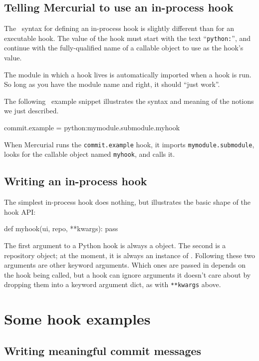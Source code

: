 \subsection{Telling Mercurial to use an in-process hook}

The \hgrc\ syntax for defining an in-process hook is slightly
different than for an executable hook.  The value of the hook must
start with the text ``\texttt{python:}'', and continue with the
fully-qualified name of a callable object to use as the hook's value.

The module in which a hook lives is automatically imported when a hook
is run.  So long as you have the module name and 
right, it should ``just work''.

The following \hgrc\ example snippet illustrates the syntax and
meaning of the notions we just described.
\begin{codesample2}
  [hooks]
  commit.example = python:mymodule.submodule.myhook
\end{codesample2}
When Mercurial runs the \texttt{commit.example} hook, it imports
\texttt{mymodule.submodule}, looks for the callable object named
\texttt{myhook}, and calls it.

\subsection{Writing an in-process hook}

The simplest in-process hook does nothing, but illustrates the basic
shape of the hook API:
\begin{codesample2}
  def myhook(ui, repo, **kwargs):
      pass
\end{codesample2}
The first argument to a Python hook is always a
 object.  The second is a repository object;
at the moment, it is always an instance of
.  Following these two
arguments are other keyword arguments.  Which ones are passed in
depends on the hook being called, but a hook can ignore arguments it
doesn't care about by dropping them into a keyword argument dict, as
with \texttt{**kwargs} above.

\section{Some hook examples}

\subsection{Writing meaningful commit messages}

